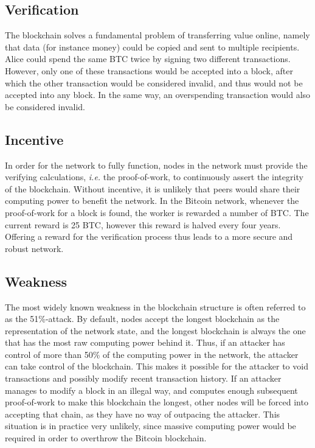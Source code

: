 \subsection{Verification}
The blockchain solves a fundamental problem of transferring value online, namely that data (for instance money) could be copied and sent to multiple recipients. Alice could spend the same BTC twice by signing two different transactions. However, only one of these transactions would be accepted into a block, after which the other transaction would be considered invalid, and thus would not be accepted into any block. In the same way, an overspending transaction would also be considered invalid.

\subsection{Incentive}
In order for the network to fully function, nodes in the network must provide the verifying calculations, \textit{i.e.} the proof-of-work, to continuously assert the integrity of the blockchain. Without incentive, it is unlikely that peers would share their computing power to benefit the network. In the Bitcoin network, whenever the proof-of-work for a block is found, the worker is rewarded a number of BTC. The current reward is 25 BTC, however this reward is halved every four years. Offering a reward for the verification process thus leads to a more secure and robust network.

\subsection{Weakness}
\label{sec:tech:weakness}
The most widely known weakness in the blockchain structure is often referred to as the 51\%-attack. By default, nodes accept the longest blockchain as the representation of the network state, and the longest blockchain is always the one that has the most raw computing power behind it. Thus, if an attacker has control of more than 50\% of the computing power in the network, the attacker can take control of the blockchain. This makes it possible for the attacker to void transactions and possibly modify recent transaction history. If an attacker manages to modify a block in an illegal way, and computes enough subsequent proof-of-work to make this blockchain the longest, other nodes will be forced into accepting that chain, as they have no way of outpacing the attacker. This situation is in practice very unlikely, since massive computing power would be required in order to overthrow the Bitcoin blockchain.

